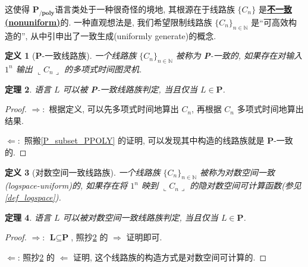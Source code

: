 \documentclass[8pt]{article}
\theoremstyle{compact}
\newtheorem{theorem}{定理}[section]
\newtheorem{definition}[theorem]{定义}
\def\obj#1{\textbf{\uline{#1}}}
\def\rep#1{\llcorner{#1}\lrcorner}
\def\P{\textbf{P}}
\def\L{\textbf{L}}
\def\PPOLY{$\textbf{P}_{\textbf{/poly}}$}
\begin{document}
这使得 \PPOLY 语言类处于一种很奇怪的境地, 其根源在于线路族 $\{C_n\}$ 是\obj{不一致(nonuniform)}的. 一种直观想法是, 我们希望限制线路族 $\{C_n\}_{n \in \mathbb N}$ 是“可高效构造的”, 从中引申出了一致生成(uniformly generate)的概念.

\begin{definition}[\P-一致线路族]
	一个线路族 $\{C_n\}_{n \in \mathbb N}$ 被称为 \P-一致的, 如果存在对输入 $1^n$ 输出 $\rep{C_n}$ 的多项式时间图灵机.
\end{definition}
\begin{theorem}
	语言 $L$ 可以被 \P-一致线路族判定, 当且仅当 $L \in \P$.
	\label{P-uniform}
\end{theorem}
\begin{proof}
	$\Rightarrow: $ 根据定义, 可以先多项式时间地算出 $C_n$, 再根据 $C_n$ 多项式时间地算出结果.
	
	$\Leftarrow: $ 照搬\cref{P_subset_PPOLY} 的证明, 可以发现其中构造的线路族就是 \P-一致的.
\end{proof}
\begin{definition}[对数空间一致线路族]
	一个线路族 $\{C_n\}_{n \in \mathbb N}$ 被称为对数空间一致(logspace-uniform)的, 如果存在将 $1^n$ 映到 $\rep{C_n}$ 的隐对数空间可计算函数(参见\cref{def_logspace}).
\end{definition}
\begin{theorem}
	语言 $L$ 可以被对数空间一致线路族判定, 当且仅当 $L \in \P$.
\end{theorem}
\begin{proof}
	$\Rightarrow$: $\L \subseteq \P$, 照抄\cref{P-uniform} 的 $\Rightarrow$ 证明即可.

	$\Leftarrow$: 照抄\cref{P-uniform} 的 $\Leftarrow$ 证明, 这个线路族的构造方式是对数空间可计算的.
\end{proof}
\end{document}
